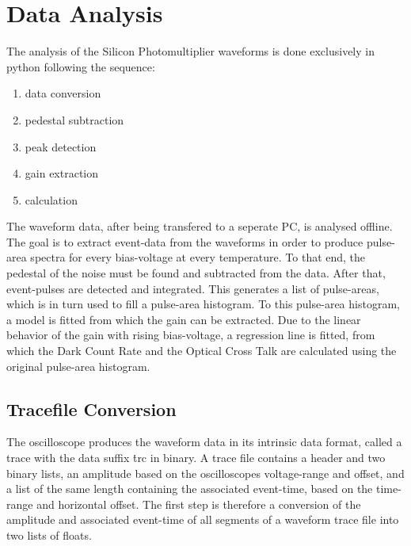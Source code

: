 \documentclass[article,type=msc,colorback,accentcolor=tud9c]{tudthesis}
\begin{document}
\section{Data Analysis}
The analysis of the Silicon Photomultiplier waveforms is done exclusively in python following the sequence:
\begin{enumerate}
\item data conversion
\item pedestal subtraction
\item peak detection
\item gain extraction
\item calculation
\end{enumerate}
The waveform data, after being transfered to a seperate PC, is analysed offline. The goal is to extract event-data from the waveforms in order to produce pulse-area spectra for every bias-voltage at every temperature. To that end, the pedestal of the noise must be found and subtracted from the data. After that, event-pulses are detected and integrated. This generates a list of pulse-areas, which is in turn used to fill a pulse-area histogram. To this pulse-area histogram, a model is fitted from which the gain can be extracted. Due to the linear behavior of the gain with rising bias-voltage, a regression line is fitted, from which the Dark Count Rate and the Optical Cross Talk are calculated using the original pulse-area histogram.

\subsection{Tracefile Conversion}
The oscilloscope produces the waveform data in its intrinsic data format, called a trace with the data suffix \.trc in binary. A trace file contains a header and two binary lists, an amplitude based on the oscilloscopes voltage-range and offset, and a list of the same length containing the associated event-time, based on the time-range and horizontal offset. The first step is therefore a conversion of the amplitude and associated event-time of all segments of a waveform trace file into two lists of floats. 
\end{document}

